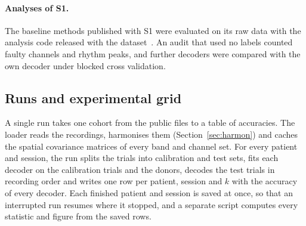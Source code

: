 \documentclass[pdflatex,sn-mathphys-num]{sn-jnl}
\begin{document}
\paragraph{Analyses of S1.} The baseline methods published with S1 were evaluated on its raw data with the analysis code released with the dataset~\cite{liu2024}. An audit that used no labels counted faulty channels and rhythm peaks, and further decoders were compared with the own decoder under blocked cross validation.

\subsection{Runs and experimental grid}\label{sec:repro}

A single run takes one cohort from the public files to a table of accuracies. The loader reads the recordings, harmonises them (Section~\ref{sec:harmon}) and caches the spatial covariance matrices of every band and channel set. For every patient and session, the run splits the trials into calibration and test sets, fits each decoder on the calibration trials and the donors, decodes the test trials in recording order and writes one row per patient, session and $k$ with the accuracy of every decoder. Each finished patient and session is saved at once, so that an interrupted run resumes where it stopped, and a separate script computes every statistic and figure from the saved rows.
\end{document}
